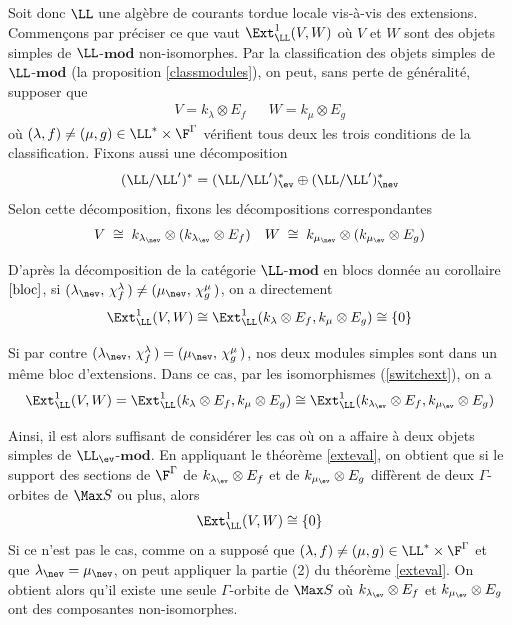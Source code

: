 Soit donc $\LL$ une algèbre de courants tordue locale vis-à-vis des extensions. Commençons par préciser ce que vaut $\Ext_\LL^1(V,W)$ où $V$ et $W$ sont des objets simples de $\LL$-$\mathbf{mod}$ non-isomorphes. Par la classification des objets simples de $\LL$-$\mathbf{mod}$ (la proposition \ref{classmodules}), on peut, sans perte de généralité, supposer que
\begin{align*}
V = k_\lambda \otimes E_f && W = k_\mu \otimes E_g
\end{align*}
où $(\lambda,f) \neq (\mu,g) \in \LL^* \times \F^\Gamma$ vérifient tous deux les trois conditions de la classification. Fixons aussi une décomposition 
$$ (\LL/\LL')^* = (\LL/\LL')_{\ev}^* \oplus (\LL/\LL')_{\nev}^* $$
Selon cette décomposition, fixons les décompositions correspondantes
\begin{align*}
V \; \cong \; k_{\lambda_{\nev}} \otimes (k_{\lambda_{\ev}} \otimes E_f) && W \; \cong \; k_{\mu_{\nev}} \otimes (k_{\mu_{\ev}} \otimes E_g)
\end{align*}

D'après la décomposition de la catégorie $\LL$-$\mathbf{mod}$ en blocs donnée au corollaire $\ref{bloc}$, si $(\lambda_{\nev},\,\chi_f^\lambda\,) \neq (\mu_{\nev},\,\chi_g^\mu\,)$, on a directement
$$ \Ext_\LL^1(V,W) \cong \Ext_\LL^1(k_\lambda \otimes E_f,k_\mu \otimes E_g) \cong \{0\} $$

Si par contre $(\lambda_{\nev},\,\chi_f^\lambda\,) = (\mu_{\nev},\,\chi_g^\mu\,)$, nos deux modules simples sont dans un même bloc d'extensions. Dans ce cas, par les isomorphismes (\ref{switchext}), on a
$$ \Ext_\LL^1(V,W) = \Ext_\LL^1(k_\lambda \otimes E_f,k_\mu \otimes E_g) \cong \Ext_\LL^1(k_{\lambda_{\ev}} \otimes E_f,k_{\mu_{\ev}} \otimes E_g) $$

Ainsi, il est alors suffisant de considérer les cas où on a affaire à deux objets simples de \linebreak $\LL_{\ev}$-$\mathbf{mod}$. En appliquant le théorème \ref{exteval}, on obtient que si le support des sections de $\F^\Gamma$ de $k_{\lambda_{\ev}} \otimes E_f$ et de $k_{\mu_{\ev}} \otimes E_g$ diffèrent de deux $\Gamma$-orbites de $\Max S$ ou plus, alors
$$ \Ext_\LL^1(V,W) \cong \{0\} $$
Si ce n'est pas le cas, comme on a supposé que $(\lambda,f) \neq (\mu,g) \in \LL^* \times \F^\Gamma$ et que $\lambda_{\nev} = \mu_{\nev}$, on peut appliquer la partie (2) du théorème \ref{exteval}. On obtient alors qu'il existe une seule $\Gamma$-orbite de $\Max S$ où $k_{\lambda_{\ev}} \otimes E_f$ et $k_{\mu_{\ev}} \otimes E_g$ ont des composantes non-isomorphes.

